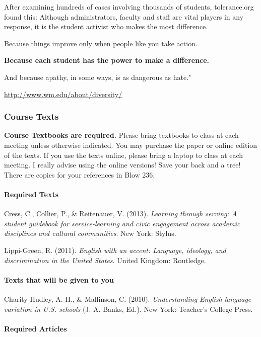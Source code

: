 \documentclass[]{article}
\let\oldparagraph\paragraph
\renewcommand{\paragraph}[1]{\oldparagraph{#1}\mbox{}}
\begin{document}
After examining hundreds of cases involving thousands of students,
tolerance.org found this: Although administrators, faculty and staff are
vital players in any response, it is the student activist who makes the
most difference.

Because things improve only when people like you take action.

\textbf{Because each student has the power to make a difference.}

And because apathy, in some ways, is as dangerous as hate."

\url{http://www.wm.edu/about/diversity/}

\subsubsection{Course Texts}\label{course-texts}

\textbf{Course Textbooks are required.} Please bring textbooks to class
at each meeting unless otherwise indicated. You may purchase the paper
or online edition of the texts. If you use the texts online, please
bring a laptop to class at each meeting. I really advise using the
online versions! Save your back and a tree! There are copies for your
references in Blow 236.

\paragraph{Required Texts}\label{required-texts}

Cress, C., Collier, P., \& Reitenauer, V. (2013). \emph{Learning through serving: A student guidebook for service-learning and civic engagement across academic disciplines and cultural communities}. New York: Stylus.

Lippi-Green, R. (2011). \emph{English with an accent: Language, ideology, and discrimination in the United States}. United Kingdom: Routledge.

\paragraph{Texts that will be given to
you}\label{texts-that-will-be-given-to-you}

Charity Hudley, A. H., \& Mallinson, C. (2010). \emph{Understanding English language variation in U.S. schools} (J. A. Banks, Ed.). New York: Teacher’s College Press.

\paragraph{Required Articles}\label{required-articles}
\end{document}
